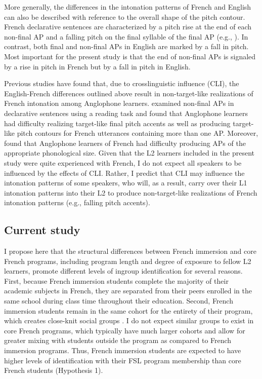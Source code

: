 \documentclass[output=paper,colorlinks,citecolor=brown,draftmode]{langscibook}
\begin{document}
More generally, the differences in the intonation patterns of French and English can also be described with reference to the overall shape of the pitch contour. French declarative sentences are characterized by a pitch rise at the end of each non-final AP and a falling pitch on the final syllable of the final AP (e.g., \citealt{Dimperio:2012}). In contrast, both final and non-final APs in English are marked by a fall in pitch. Most important for the present study is that the end of non-final APs is signaled by a rise in pitch in French but by a fall in pitch in English.


Previous studies have found that, due to crosslinguistic influence (CLI), the English-French differences outlined above result in non-target-like realizations of French intonation among Anglophone learners. \citet{Lepetit1989} examined non-final APs in declarative sentences using a reading task and found that Anglophone learners had difficulty realizing target-like final pitch accents as well as producing target-like pitch contours for French utterances containing more than one AP. Moreover, \citet{Colantoni:2014} found that Anglophone learners of French had difficulty producing APs of the appropriate phonological size. Given that the L2 learners included in the present study were quite experienced with French, I do not expect all speakers to be influenced by the effects of CLI. Rather, I predict that CLI may influence the intonation patterns of some speakers, who will, as a result, carry over their L1 intonation patterns into their L2 to produce non-target-like realizations of French intonation patterns (e.g., falling pitch accents).

\subsection{Current study}\label{sec:11:2.4}
I propose here that the structural differences between French immersion and core French programs, including program length and degree of exposure to fellow L2 learners, promote different levels of ingroup identification for several reasons. First, because French immersion students complete the majority of their academic subjects in French, they are separated from their peers enrolled in the same school during class time throughout their education. Second, French immersion students remain in the same cohort for the entirety of their program, which creates close-knit social groups \citep{Lyster1987}. I do not expect similar groups to exist in core French programs, which typically have much larger cohorts and allow for greater mixing with students outside the program as compared to French immersion programs. Thus, French immersion students are expected to have higher levels of identification with their FSL program membership than core French students (Hypothesis 1).
\end{document}
